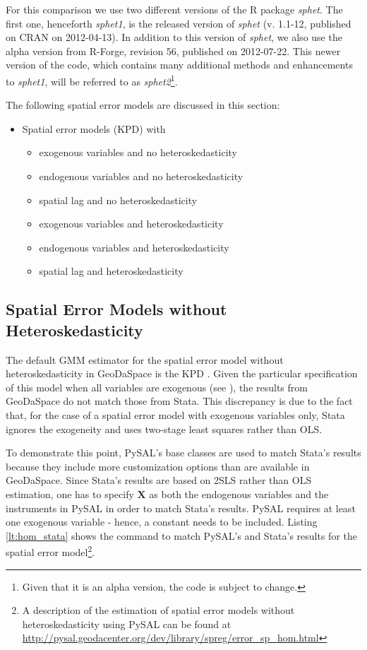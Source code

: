 \documentclass{article}
\begin{document}
For this comparison we use two different versions of the R package \emph{sphet}. The first one, henceforth \emph{sphet1}, is the released version of \emph{sphet} (v. 1.1-12, published on CRAN on 2012-04-13). In addition to this version of \emph{sphet}, we also use the alpha version from R-Forge, revision 56, published on 2012-07-22. This newer version of the code, which contains many additional methods and enhancements to \emph{sphet1}, will be referred to as \emph{sphet2}\footnote{Given that it is an alpha version, the code is subject to change.}.


The following spatial error models are discussed in this section:

\begin{itemize}
\item Spatial error models (KPD) with 
	\begin{itemize}
	\item exogenous variables and no heteroskedasticity
	\item endogenous variables and no heteroskedasticity
	\item spatial lag and no heteroskedasticity
	\item exogenous variables and heteroskedasticity
	\item endogenous variables and heteroskedasticity
	\item spatial lag and heteroskedasticity
	\end{itemize}
\end{itemize}

\subsection{Spatial Error Models without Heteroskedasticity}

The default GMM estimator for the spatial error model without heteroskedasticity in GeoDaSpace is the KPD \citep{Drukker10}. Given the particular specification of this model when all variables are exogenous (see \citet{Anselin11}), the results from GeoDaSpace do not match those from Stata. This discrepancy is due to the fact that, for the case of a spatial error model with exogenous variables only, Stata ignores the exogeneity and uses two-stage least squares rather than OLS.

To demonstrate this point, PySAL's base classes are used to match Stata's results because they include more customization options than are available in GeoDaSpace. Since Stata's results are based on 2SLS rather than OLS estimation, one has to specify $\mathbf{X}$ as both the endogenous variables and the instruments in PySAL in order to match Stata's results. PySAL requires at least one exogenous variable - hence, a constant needs to be included. Listing \ref{lt:hom_stata} shows the command to match PySAL's and Stata's results for the spatial error model\footnote{A description of the estimation of spatial error models without heteroskedasticity using PySAL can be found at \url{http://pysal.geodacenter.org/dev/library/spreg/error_sp_hom.html}}. 
\end{document}
